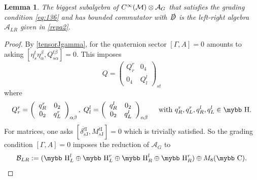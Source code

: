 \documentclass[11pt]{article}
\newcommand{\cinf}{{C^\infty({\cal M})}}
\newcommand{\A}{\mathcal A}
\def\bb#1{\hbox{\mybb#1}}
\newcommand{\sI}{\mathrm  I}
\newcommand{\sJ}{\mathrm J}
\newtheorem{lemma}[prop]{Lemma}
\begin{document}
\begin{lemma}
The biggest
  subalgebra of $\cinf \otimes\A_G$ that satisfies the grading condition 
  \eqref{eq:136} and has bounded commutator with $\slashed D$ is the
  left-right algebra  $\A_{LR}$ given in \eqref{repa2}. 
\end{lemma}
\begin{proof}
By \eqref{tensorJgamma}, for
the quaternion sector $[\Gamma, A]=0$ amounts to asking 
 $[\eta_s^t\eta_\alpha^\beta,Q_{s\alpha}^{t\beta}]=0$. This  imposes 
\begin{equation}
  \label{eq:58}
  Q = \left( 
    \begin{array}{cc}
      Q^r_r & 0_4 \\ 
      0_4 & Q^l_l
    \end{array}\right)_{st} 
\end{equation}
where 
\begin{equation}
   \label{eq:60}
   Q^{r}_{r}=\left(
     \begin{array}{cc}
       {q^r_R}& 0_2 \\
       0_2 & {q^r_L}
     \end{array}
  \right)_{\alpha\beta}, \; Q^{l}_{l}=\left(
     \begin{array}{cc}
       {q^l_R}& 0_2 \\
       0_2 & {q^l_L}
     \end{array}
  \right)_{\alpha\beta} \quad
\text{ with } q^r_R, q^r_L, q^l_R, q^l_L\in \bb H.
\end{equation}
For matrices, one asks $[\delta^{\dot t \sI}_{\dot s
  \sJ}, M^{\dot t \sI}_{\dot s \sJ}]=0$ which is trivially
satisfied. So the grading condition $[\Gamma,
A]=0$ imposes the reduction of $\A_G$ to
\begin{equation}
  \label{eq:62}
{\cal  B}_{LR} :=(\bb H^l_L \oplus \bb H^r_L \oplus \bb H^l_R \oplus \bb H^r_R) \oplus
M_8(\bb C). 
\end{equation}


\end{proof}
\end{document}
